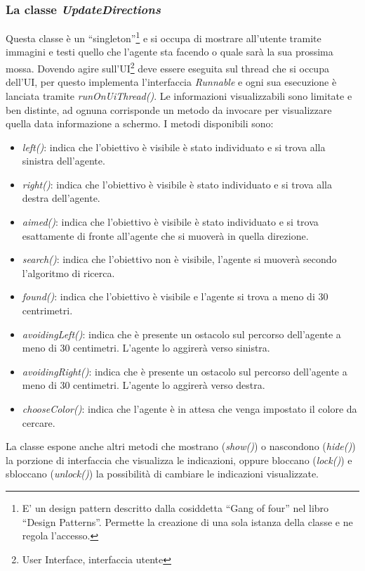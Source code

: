 \subsubsection{La classe \emph{UpdateDirections}}
Questa classe è un ``singleton''\footnote{E' un design pattern descritto dalla 
cosiddetta ``Gang of four'' nel libro ``Design Patterns''. 
Permette la creazione di una sola istanza della classe e ne regola l'accesso. } 
e si occupa di mostrare all'utente tramite  immagini e testi quello che l'agente
sta facendo o quale sarà la sua prossima  mossa. Dovendo agire 
sull'UI\footnote{User Interface, interfaccia utente} deve essere eseguita sul thread
che si occupa dell'UI, per questo implementa l'interfaccia \emph{Runnable} e 
ogni sua esecuzione è lanciata  tramite \emph{runOnUiThread()}. 
Le informazioni visualizzabili sono limitate e ben distinte,
ad ognuna corrisponde un metodo da invocare per visualizzare quella data informazione
a schermo. I metodi disponibili sono: 
\begin{itemize}
	\item \emph{left()}: indica che l'obiettivo è visibile è stato individuato e si trova alla sinistra dell'agente.
	\item \emph{right()}: indica che l'obiettivo è visibile è stato individuato e si trova alla destra dell'agente.
	\item \emph{aimed()}: indica che l'obiettivo è visibile è stato individuato e si trova esattamente di fronte all'agente che si muoverà in quella direzione.
	\item \emph{search()}: indica che l'obiettivo non è visibile, l'agente si muoverà secondo l'algoritmo di ricerca.
	\item \emph{found()}: indica che l'obiettivo è visibile e l'agente si trova a meno di 30 centrimetri.
	\item \emph{avoidingLeft()}: indica che è presente un ostacolo sul percorso dell'agente a meno di 30 centimetri. L'agente lo aggirerà verso sinistra. 
	\item \emph{avoidingRight()}: indica che è presente un ostacolo sul percorso dell'agente a meno di 30 centimetri. L'agente lo aggirerà verso destra.
	\item \emph{chooseColor()}: indica che l'agente è in attesa che venga impostato il colore da cercare. 
\end{itemize}
La classe espone anche altri metodi che mostrano (\emph{show()}) o nascondono 
(\emph{hide()}) la porzione di interfaccia che visualizza le indicazioni, oppure bloccano (\emph{lock()})
e sbloccano (\emph{unlock()}) la possibilità di cambiare le indicazioni visualizzate.


